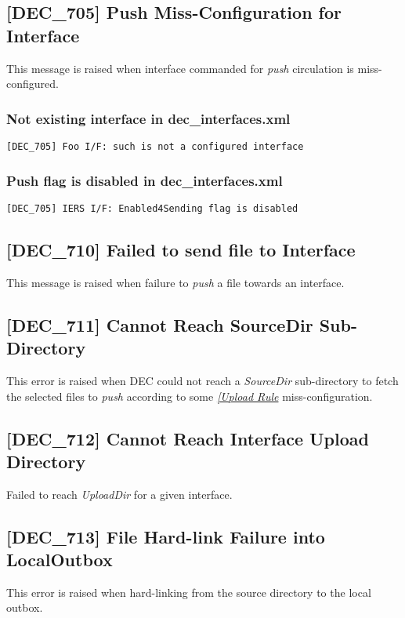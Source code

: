 \documentclass[dec_sum_main.tex]{subfiles}
\begin{document}
\label{DEC705}
\subsection{[DEC\_705] Push Miss-Configuration for Interface}
This message is raised when interface commanded for \textit{push} circulation is miss-configured.

\subsubsection{Not existing interface in dec\_interfaces.xml }
\begin{verbatim}
[DEC_705] Foo I/F: such is not a configured interface
\end{verbatim}

\subsubsection{Push flag is disabled in dec\_interfaces.xml }
\begin{verbatim}
[DEC_705] IERS I/F: Enabled4Sending flag is disabled
\end{verbatim}

\label{DEC710}
\subsection{[DEC\_710] Failed to send file to Interface}
This message is raised when failure to \textit{push} a file towards an interface.

\label{DEC711}
\subsection{[DEC\_711] Cannot Reach SourceDir Sub-Directory}
This error is raised when DEC could not reach a \textit{SourceDir} sub-directory to fetch the selected files to \textit{push} according to some \hyperref[Upload Rules]{\textit{[Upload Rule}} miss-configuration.

\label{DEC712}
\subsection{[DEC\_712] Cannot Reach Interface Upload Directory}
Failed to reach \textit{UploadDir} for a given interface.

\label{DEC713}
\subsection{[DEC\_713] File Hard-link Failure into LocalOutbox}
This error is raised when hard-linking from the source directory to the local outbox.
\end{document}
